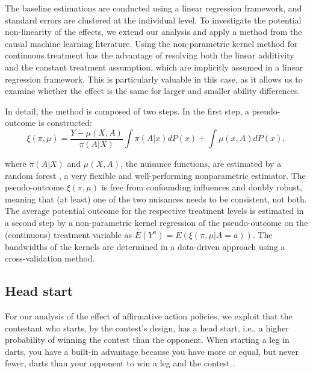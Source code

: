 \documentclass[11pt,a4paper]{article}
\begin{document}
The baseline estimations are conducted using a linear regression framework, and standard errors are clustered at the individual level. To investigate the potential non-linearity of the effects, we extend our analysis and apply a method from the causal machine learning literature. Using the non-parametric kernel method for continuous treatment \cite{Kennedy.2017} has the advantage of resolving both the linear additivity and the constant treatment assumption, which are implicitly assumed in a linear regression framework. This is particularly valuable in this case, as it allows us to examine whether the effect is the same for larger and smaller ability differences.\par 

In detail, the method is composed of two steps. In the first step, a pseudo-outcome is constructed:
\begin{equation*}
        \xi(\pi,\mu) = \frac{Y-\mu(X,A)}{\pi(A|X)} \int \pi(A|x)dP(x) + \int \mu(x,A)dP(x),
\end{equation*}

\noindent
where $\pi(A|X)$ and $\mu(X,A)$, the nuisance functions, are estimated by a random forest \cite{Breiman.2001}, a very flexible and well-performing nonparametric estimator. The pseudo-outcome $\xi(\pi,\mu)$ is free from confounding influences and doubly robust, meaning that (at least) one of the two nuisances needs to be consistent, not both. 
The average potential outcome for the respective treatment levels is estimated in a second step by a non-parametric kernel regression of the pseudo-outcome on the (continuous) treatment variable as $E(Y^a)=E(\xi(\pi,\mu|A=a))$. The bandwidths of the kernels are determined in a data-driven approach using a cross-validation method.\par


\subsection{Head start}\label{subsec:ident_hs}

For our analysis of the effect of affirmative action policies, we exploit that the contestant who starts, by the contest's design, has a head start, i.e., a higher probability of winning the contest than the opponent. When starting a leg in darts, you have a built-in advantage because you have more or equal, but never fewer, darts than your opponent to win a leg and the contest \cite{Goller.2023}.\par
\end{document}
